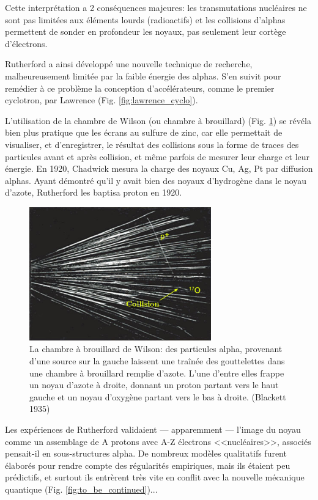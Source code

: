Cette interprétation a 2 conséquences majeures: les transmutations nucléaires ne sont pas limitées aux éléments lourds (radioactifs) et les collisions d'alphas permettent de sonder en profondeur les noyaux, pas seulement leur cortège d'électrons.

Rutherford a ainsi développé une nouvelle technique de recherche, malheureusement limitée par la faible énergie des alphas. S'en suivit pour remédier à ce problème la conception d'accélérateurs, comme le premier cyclotron, par Lawrence (Fig. \ref{fig:lawrence_cyclo}).

L’utilisation de la chambre de Wilson (ou chambre à brouillard) (Fig. \ref{fig:chambre_wilson}) se révéla bien plus pratique que les écrans au sulfure de zinc, car elle permettait de visualiser, et d’enregistrer, le résultat des collisions sous la forme de traces des particules avant et après collision, et même parfois de mesurer leur charge et leur énergie. En 1920, Chadwick mesura la charge des noyaux Cu, Ag, Pt par diffusion alphas. Ayant démontré qu’il y avait bien des noyaux d’hydrogène dans le noyau d’azote, Rutherford les baptisa proton en 1920.

\begin{figure}[ht]
    \centering
    \includegraphics[width=0.7\textwidth]{Images1/collisions_alpha_proton.jpg}
    \caption{La chambre à brouillard de Wilson: des particules alpha, provenant d'une source sur la gauche laissent une traînée des gouttelettes dans une chambre à brouillard remplie d'azote. L'une d'entre elles frappe un noyau d'azote à droite, donnant un proton partant vers le haut gauche et un noyau d'oxygène partant vers le bas à droite. (Blackett 1935)}
    \label{fig:chambre_wilson}
\end{figure}

Les expériences de Rutherford validaient --- apparemment --- l’image du noyau comme un assemblage de A protons avec A-Z électrons <<nucléaires>>, associés pensait-il en sous-structures alpha. De nombreux modèles qualitatifs furent élaborés pour rendre compte des régularités empiriques, mais ils étaient peu prédictifs, et surtout ils entrèrent très vite en conflit avec la nouvelle mécanique quantique (Fig. \ref{fig:to_be_continued})...

